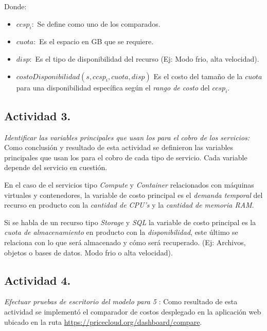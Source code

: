 Donde:
\begin{itemize}
    \item $ccsp_i:$ Se define como uno de los  comparados.
    \item $cuota:$ Es el espacio en GB que se requiere.
    \item $disp:$ Es el tipo de disponibilidad del recurso (Ej: Modo frio, alta velocidad).
    \item $costoDisponibilidad(s,ccsp_i,cuota,disp)$ Es el costo del tamaño de la $cuota$ para una disponibilidad específica según el \emph{rango de costo} del $ccsp_i$.
\end{itemize}

\subsection{Actividad 3.}
\emph{Identificar las variables principales que usan los  para el cobro de los servicios:}
\newline\newline
Como conclusión y resultado de esta actividad se definieron las variables principales que usan los  para el cobro de cada tipo de servicio. Cada variable depende del servicio en cuestión.
\newline

En el caso de el servicios tipo \emph{Compute} y \emph{Container} relacionados con máquinas virtuales y contenedores, la variable de costo principal es el \emph{demanda temporal} del recurso en producto con la \emph{cantidad de CPU's} y la \emph{cantidad de memoria RAM}.
\newline

Si se habla de un recurso tipo \emph{Storage} y \emph{SQL} la variable de costo principal es la \emph{cuota de almacenamiento} en producto con la \emph{disponibilidad}, este último se relaciona con lo que será almacenado y cómo será recuperado. (Ej: Archivos, objetos o bases de datos. Modo frio o alta velocidad).
\newline

\subsection{Actividad 4.}
\emph{Efectuar pruebas de escritorio del modelo para 5 }:
\newline\newline
Como resultado de esta actividad se implementó el comparador de costos desplegado en la aplicación web ubicado en la ruta \url{https://pricecloud.org/dashboard/compare}.

